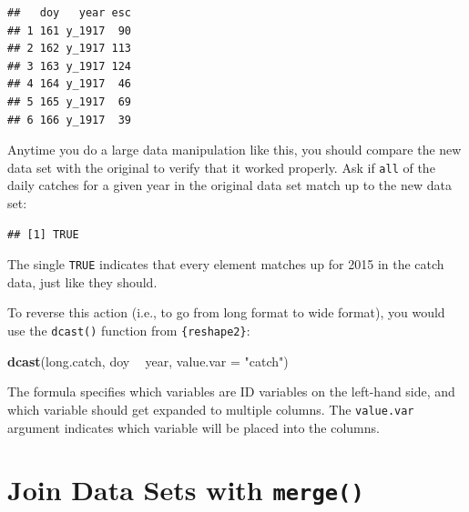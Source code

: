 \documentclass[]{book}
\newenvironment{Shaded}{\begin{snugshade}}{\end{snugshade}}
\newcommand{\DataTypeTok}[1]{\textcolor[rgb]{0.13,0.29,0.53}{#1}}
\newcommand{\DecValTok}[1]{\textcolor[rgb]{0.00,0.00,0.81}{#1}}
\newcommand{\KeywordTok}[1]{\textcolor[rgb]{0.13,0.29,0.53}{\textbf{#1}}}
\newcommand{\NormalTok}[1]{#1}
\newcommand{\OperatorTok}[1]{\textcolor[rgb]{0.81,0.36,0.00}{\textbf{#1}}}
\newcommand{\StringTok}[1]{\textcolor[rgb]{0.31,0.60,0.02}{#1}}
\begin{document}
\begin{verbatim}
##   doy   year esc
## 1 161 y_1917  90
## 2 162 y_1917 113
## 3 163 y_1917 124
## 4 164 y_1917  46
## 5 165 y_1917  69
## 6 166 y_1917  39
\end{verbatim}

Anytime you do a large data manipulation like this, you should compare the new data set with the original to verify that it worked properly. Ask if \texttt{all} of the daily catches for a given year in the original data set match up to the new data set:

\begin{Shaded}
\end{Shaded}

\begin{verbatim}
## [1] TRUE
\end{verbatim}

The single \texttt{TRUE} indicates that every element matches up for 2015 in the catch data, just like they should.

To reverse this action (i.e., to go from long format to wide format), you would use the \texttt{dcast()} function from \texttt{\{reshape2\}}:

\begin{Shaded}
\begin{Highlighting}[]
\KeywordTok{dcast}\NormalTok{(long.catch, doy }\OperatorTok{~}\StringTok{ }\NormalTok{year, }\DataTypeTok{value.var =} \StringTok{"catch"}\NormalTok{)}
\end{Highlighting}
\end{Shaded}

The formula specifies which variables are ID variables on the left-hand side, and which variable should get expanded to multiple columns. The \texttt{value.var} argument indicates which variable will be placed into the columns.

\hypertarget{join-data-sets-with-merge}{%
\section{\texorpdfstring{Join Data Sets with \texttt{merge()}}{Join Data Sets with merge()}}\label{join-data-sets-with-merge}}
\end{document}
